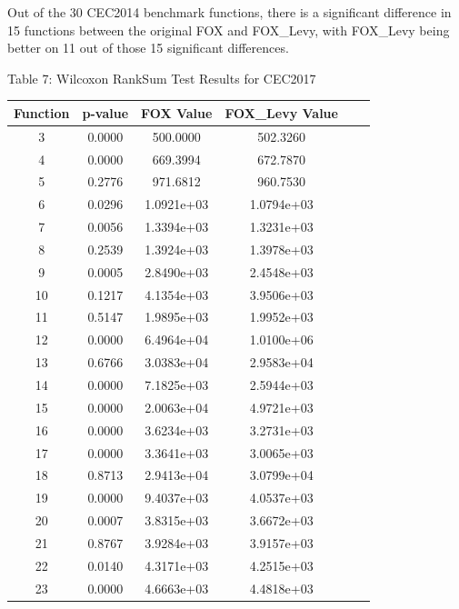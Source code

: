 \documentclass[
]{article}
\begin{document}
\begin{justify}
{Out of the 30 CEC2014 benchmark functions, there is a significant difference in 15 functions between the original FOX and FOX\_Levy, with FOX\_Levy being better on 11 out of those 15 significant differences.



\vspace{100mm}
\begin{center}
Table 7: Wilcoxon RankSum Test Results for CEC2017
\end{center}
\begin{table}[htbp]
\centering
  
  \vspace{1mm}
  \label{tab:results}
  \begin{tabular}{cccccc}
    \toprule
    Function & p-value & FOX Value & FOX\_Levy Value \\
    \midrule
    3 & 0.0000 & 500.0000 & 502.3260 \\
    4 & 0.0000 & 669.3994 & 672.7870 \\
    5 & 0.2776 & 971.6812 & 960.7530 \\
    6 & 0.0296 & 1.0921e+03 & 1.0794e+03 \\
    7 & 0.0056 & 1.3394e+03 & 1.3231e+03 \\
    8 & 0.2539 & 1.3924e+03 & 1.3978e+03 \\
    9 & 0.0005 & 2.8490e+03 & 2.4548e+03 \\
    10 & 0.1217 & 4.1354e+03 & 3.9506e+03 \\
    11 & 0.5147 & 1.9895e+03 & 1.9952e+03 \\
    12 & 0.0000 & 6.4964e+04 & 1.0100e+06 \\
    13 & 0.6766 & 3.0383e+04 & 2.9583e+04 \\
    14 & 0.0000 & 7.1825e+03 & 2.5944e+03 \\
    15 & 0.0000 & 2.0063e+04 & 4.9721e+03 \\
    16 & 0.0000 & 3.6234e+03 & 3.2731e+03 \\
    17 & 0.0000 & 3.3641e+03 & 3.0065e+03 \\
    18 & 0.8713 & 2.9413e+04 & 3.0799e+04 \\
    19 & 0.0000 & 9.4037e+03 & 4.0537e+03 \\
    20 & 0.0007 & 3.8315e+03 & 3.6672e+03 \\
    21 & 0.8767 & 3.9284e+03 & 3.9157e+03 \\
    22 & 0.0140 & 4.3171e+03 & 4.2515e+03 \\
    23 & 0.0000 & 4.6663e+03 & 4.4818e+03 \\

\end{tabular}
\end{table}}
\end{justify}
\end{document}
